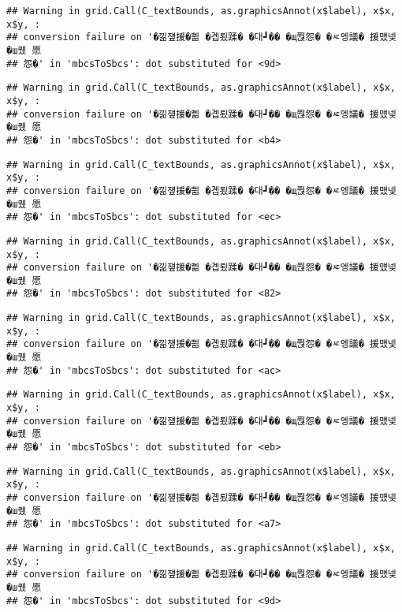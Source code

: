 \documentclass[
]{article}
\begin{document}
\begin{verbatim}
## Warning in grid.Call(C_textBounds, as.graphicsAnnot(x$label), x$x, x$y, :
## conversion failure on '�낆쟾援�쁾 �곕룄蹂� �대┛�� �щ쭩怨� �ㅼ엥議� 援먰넻�ш퀬 愿
## 怨�' in 'mbcsToSbcs': dot substituted for <9d>
\end{verbatim}

\begin{verbatim}
## Warning in grid.Call(C_textBounds, as.graphicsAnnot(x$label), x$x, x$y, :
## conversion failure on '�낆쟾援�쁾 �곕룄蹂� �대┛�� �щ쭩怨� �ㅼ엥議� 援먰넻�ш퀬 愿
## 怨�' in 'mbcsToSbcs': dot substituted for <b4>
\end{verbatim}

\begin{verbatim}
## Warning in grid.Call(C_textBounds, as.graphicsAnnot(x$label), x$x, x$y, :
## conversion failure on '�낆쟾援�쁾 �곕룄蹂� �대┛�� �щ쭩怨� �ㅼ엥議� 援먰넻�ш퀬 愿
## 怨�' in 'mbcsToSbcs': dot substituted for <ec>
\end{verbatim}

\begin{verbatim}
## Warning in grid.Call(C_textBounds, as.graphicsAnnot(x$label), x$x, x$y, :
## conversion failure on '�낆쟾援�쁾 �곕룄蹂� �대┛�� �щ쭩怨� �ㅼ엥議� 援먰넻�ш퀬 愿
## 怨�' in 'mbcsToSbcs': dot substituted for <82>
\end{verbatim}

\begin{verbatim}
## Warning in grid.Call(C_textBounds, as.graphicsAnnot(x$label), x$x, x$y, :
## conversion failure on '�낆쟾援�쁾 �곕룄蹂� �대┛�� �щ쭩怨� �ㅼ엥議� 援먰넻�ш퀬 愿
## 怨�' in 'mbcsToSbcs': dot substituted for <ac>
\end{verbatim}

\begin{verbatim}
## Warning in grid.Call(C_textBounds, as.graphicsAnnot(x$label), x$x, x$y, :
## conversion failure on '�낆쟾援�쁾 �곕룄蹂� �대┛�� �щ쭩怨� �ㅼ엥議� 援먰넻�ш퀬 愿
## 怨�' in 'mbcsToSbcs': dot substituted for <eb>
\end{verbatim}

\begin{verbatim}
## Warning in grid.Call(C_textBounds, as.graphicsAnnot(x$label), x$x, x$y, :
## conversion failure on '�낆쟾援�쁾 �곕룄蹂� �대┛�� �щ쭩怨� �ㅼ엥議� 援먰넻�ш퀬 愿
## 怨�' in 'mbcsToSbcs': dot substituted for <a7>
\end{verbatim}

\begin{verbatim}
## Warning in grid.Call(C_textBounds, as.graphicsAnnot(x$label), x$x, x$y, :
## conversion failure on '�낆쟾援�쁾 �곕룄蹂� �대┛�� �щ쭩怨� �ㅼ엥議� 援먰넻�ш퀬 愿
## 怨�' in 'mbcsToSbcs': dot substituted for <9d>
\end{verbatim}
\end{document}
